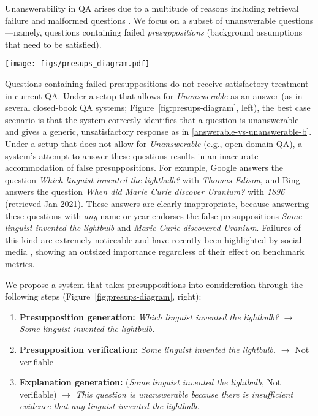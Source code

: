 \documentclass[11pt,a4paper]{article}
\begin{document}
Unanswerability in QA arises due to a multitude of reasons including retrieval failure and malformed questions \citep{kwiatkowski-etal-2019-natural}. We focus on a subset of unanswerable questions---namely, questions containing failed \textit{presuppositions} (background assumptions that need to be satisfied). 

\begin{figure*}[t]
    \centering
    \texttt{[image: figs/presups\_diagram.pdf]}
    \caption{A comparison of existing closed-book QA pipelines (left) and the proposed QA pipeline in this work (right). The gray part of the pipeline is only manually applied in this work to conduct headroom analysis.}
    \label{fig:presups-diagram}
\end{figure*}

Questions containing failed presuppositions do not receive satisfactory treatment in current QA. Under a setup that allows for \textit{Unanswerable} as an answer (as in several closed-book QA systems; Figure~\ref{fig:presups-diagram}, left), the best case scenario is that the system correctly identifies that a question is unanswerable and gives a generic, unsatisfactory response as in \ref{answerable-vs-unanswerable-b}. Under a setup that does not allow for \textit{Unanswerable} (e.g., open-domain QA), a system's attempt to answer these questions results in an inaccurate accommodation of false presuppositions. For example, Google answers the question \textit{Which linguist invented the lightbulb?} with \textit{Thomas Edison}, and Bing answers the question \textit{When did Marie Curie discover Uranium?} with \textit{1896} (retrieved Jan 2021). These answers are clearly inappropriate, because answering these questions with \textit{any} name or year endorses the false presuppositions \textit{Some linguist invented the lightbulb} and \textit{Marie Curie discovered Uranium}. Failures of this kind are extremely noticeable and have recently been highlighted by social media \citep{munroe2020}, showing an outsized importance regardless of their effect on benchmark metrics.

We propose a system that takes presuppositions into consideration through the following steps (Figure~\ref{fig:presups-diagram}, right):

\begin{enumerate}
\itemsep -2pt
    \item \textbf{Presupposition generation:} \textit{Which linguist invented the lightbulb?} $\rightarrow$ \textit{Some linguist invented the lightbulb.}
    \item \textbf{Presupposition verification:} \textit{Some linguist invented the lightbulb.} $\rightarrow$ Not verifiable
    \item \textbf{Explanation generation:} (\textit{Some linguist invented the lightbulb}, Not verifiable) $\rightarrow$ \textit{This question is unanswerable because there is insufficient evidence that any linguist invented the lightbulb.}
\end{enumerate}
\end{document}

